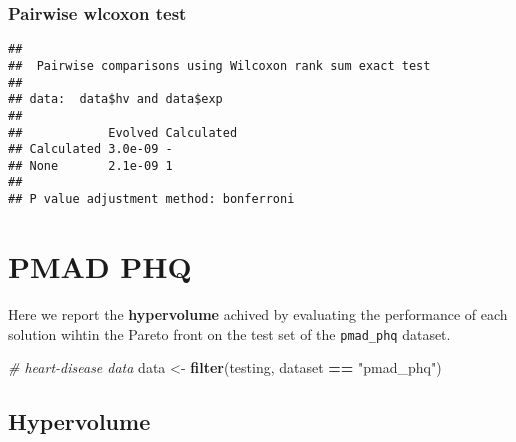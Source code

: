 \documentclass[
]{book}
\newenvironment{Shaded}{\begin{snugshade}}{\end{snugshade}}
\newcommand{\AttributeTok}[1]{\textcolor[rgb]{0.13,0.29,0.53}{#1}}
\newcommand{\CommentTok}[1]{\textcolor[rgb]{0.56,0.35,0.01}{\textit{#1}}}
\newcommand{\ConstantTok}[1]{\textcolor[rgb]{0.56,0.35,0.01}{#1}}
\newcommand{\FunctionTok}[1]{\textcolor[rgb]{0.13,0.29,0.53}{\textbf{#1}}}
\newcommand{\NormalTok}[1]{#1}
\newcommand{\OtherTok}[1]{\textcolor[rgb]{0.56,0.35,0.01}{#1}}
\newcommand{\SpecialCharTok}[1]{\textcolor[rgb]{0.81,0.36,0.00}{\textbf{#1}}}
\newcommand{\StringTok}[1]{\textcolor[rgb]{0.31,0.60,0.02}{#1}}
\begin{document}
\hypertarget{pairwise-wlcoxon-test-10}{%
\subsection{Pairwise wlcoxon test}\label{pairwise-wlcoxon-test-10}}

\begin{Shaded}
\end{Shaded}

\begin{verbatim}
## 
##  Pairwise comparisons using Wilcoxon rank sum exact test 
## 
## data:  data$hv and data$exp 
## 
##            Evolved Calculated
## Calculated 3.0e-09 -         
## None       2.1e-09 1         
## 
## P value adjustment method: bonferroni
\end{verbatim}

\hypertarget{pmad-phq}{%
\chapter{PMAD PHQ}\label{pmad-phq}}

Here we report the \textbf{hypervolume} achived by evaluating the performance of each solution wihtin the Pareto front on the test set of the \texttt{pmad\_phq} dataset.

\begin{Shaded}
\begin{Highlighting}[]
\CommentTok{\# heart{-}disease data}
\NormalTok{data }\OtherTok{\textless{}{-}} \FunctionTok{filter}\NormalTok{(testing, dataset }\SpecialCharTok{==} \StringTok{"pmad\_phq"}\NormalTok{)}
\end{Highlighting}
\end{Shaded}

\hypertarget{hypervolume-11}{%
\section{Hypervolume}\label{hypervolume-11}}
\end{document}
